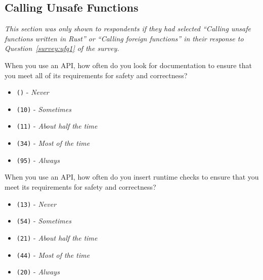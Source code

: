 \subsection{Calling Unsafe Functions}
\label{survey:sec:cufq}
\textit{This section was only shown to respondents if they had selected ``\textit{Calling unsafe functions written in Rust}'' or ``\textit{Calling foreign functions}'' in their response to Question~\ref{survey:ufq1} of the survey.}
\begin{protocol}
\item \label{survey:cufq1}  When you use an \unsafe API, how often do you look for documentation to ensure that you meet all of its requirements for safety and correctness?
\begin{itemize}
\item \texttt{()} - \textit{Never}
\item \texttt{(10)} - \textit{Sometimes}
\item \texttt{(11)} - \textit{About half the time}
\item \texttt{(34)} - \textit{Most of the time}
\item \texttt{(95)} - \textit{Always}
\end{itemize}
\item \label{survey:cufq2}  When you use an \unsafe API, how often do you insert runtime checks to ensure that you meet its requirements for safety and correctness?
\begin{itemize}
\item \texttt{(13)} - \textit{Never}
\item \texttt{(54)} - \textit{Sometimes}
\item \texttt{(21)} - \textit{About half the time}
\item \texttt{(44)} - \textit{Most of the time}
\item \texttt{(20)} - \textit{Always}
\end{itemize}
\end{protocol}

